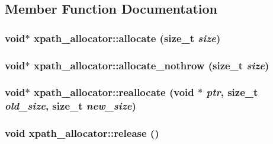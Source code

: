\subsection{Member Function Documentation}
\hypertarget{classxpath__allocator_aad95aa445f2fdc7c3d1c19b1f3d67cb1}{
\subsubsection[{allocate}]{\setlength{\rightskip}{0pt plus 5cm}void$\ast$ xpath\_\-allocator::allocate (size\_\-t {\em size})}}
\label{classxpath__allocator_aad95aa445f2fdc7c3d1c19b1f3d67cb1}
\hypertarget{classxpath__allocator_aa66f3703548657eca5316392a2d79d00}{
\subsubsection[{allocate\_\-nothrow}]{\setlength{\rightskip}{0pt plus 5cm}void$\ast$ xpath\_\-allocator::allocate\_\-nothrow (size\_\-t {\em size})}}
\label{classxpath__allocator_aa66f3703548657eca5316392a2d79d00}
\hypertarget{classxpath__allocator_a4dd502389202ec8e7420832112a571e5}{
\subsubsection[{reallocate}]{\setlength{\rightskip}{0pt plus 5cm}void$\ast$ xpath\_\-allocator::reallocate (void $\ast$ {\em ptr}, \/  size\_\-t {\em old\_\-size}, \/  size\_\-t {\em new\_\-size})}}
\label{classxpath__allocator_a4dd502389202ec8e7420832112a571e5}
\hypertarget{classxpath__allocator_a9436b8bdef3e0e0ff0df28c2af6a430d}{
\subsubsection[{release}]{\setlength{\rightskip}{0pt plus 5cm}void xpath\_\-allocator::release ()}}
